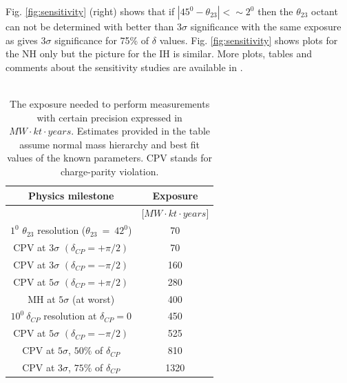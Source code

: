 Fig. \ref{fig:sensitivity} (right) shows that if $|45^0-\theta_{23}|<\sim 2^0$ then the $\theta_{23}$ octant can not be determined with better than $3\sigma$ significance with the same exposure as gives $3\sigma$ significance for 75\% of $\delta$ values. Fig. \ref{fig:sensitivity} shows plots for the NH only but the picture for the IH is similar. More plots, tables and comments about the sensitivity studies are available in \cite{ref_LBNF_CDR}.\\ \\
\begin{table}[h]
  \centering
  \begin{center}
  \caption{ The exposure needed to perform measurements with certain precision expressed in $MW \cdot kt \cdot years$. Estimates provided in the table assume normal mass hierarchy and best fit values of the known parameters. CPV stands for charge-parity violation. }
  \begin{tabular}{|c|c|}
  \hline  
  Physics milestone & Exposure  \\ \hline
   & [$MW \cdot kt \cdot years$]  \\ \hline
  $1^0$ $\theta_{23}$ resolution ($\theta_{23}~=~42^0$) & 70 \\ \hline
  CPV at $3\sigma$ $(\delta_{CP}=+\pi/2)$ & 70  \\ \hline
  CPV at $3\sigma$ $(\delta_{CP}=-\pi/2)$ & 160  \\ \hline
  CPV at $5\sigma$ $(\delta_{CP}=+\pi/2)$ & 280  \\ \hline
  MH at $5\sigma$ (at worst) & 400  \\ \hline
  $10^0~\delta_{CP}$ resolution at $\delta_{CP}=0$ & 450  \\ \hline
  CPV at $5\sigma$ $(\delta_{CP}=-\pi/2)$ & 525  \\ \hline
  CPV at $5\sigma$, $50\%$ of $\delta_{CP}$ & 810  \\ \hline
  CPV at $3\sigma$, $75\%$ of $\delta_{CP}$ & 1320  \\ \hline
  \end{tabular}
  \label{tab:exposures_needed}
  \end{center}
\end{table}
